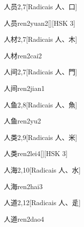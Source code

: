 \begin{entry}{人员}{2,7}[Radicais ⼈、⼝]
  \begin{phonetics}{人员}{ren2yuan2}[][HSK 3]
  \end{phonetics}
\end{entry}

\begin{entry}{人材}{2,7}[Radicais ⼈、⽊]
  \begin{phonetics}{人材}{ren2cai2}
  \end{phonetics}
\end{entry}

\begin{entry}{人间}{2,7}[Radicais ⼈、⾨]
  \begin{phonetics}{人间}{ren2jian1}
  \end{phonetics}
\end{entry}

\begin{entry}{人鱼}{2,8}[Radicais ⼈、⿂]
  \begin{phonetics}{人鱼}{ren2yu2}
  \end{phonetics}
\end{entry}

\begin{entry}{人类}{2,9}[Radicais ⼈、⽶]
  \begin{phonetics}{人类}{ren2lei4}[][HSK 3]
  \end{phonetics}
\end{entry}

\begin{entry}{人海}{2,10}[Radicais ⼈、⽔]
  \begin{phonetics}{人海}{ren2hai3}
  \end{phonetics}
\end{entry}

\begin{entry}{人道}{2,12}[Radicais ⼈、⾡]
  \begin{phonetics}{人道}{ren2dao4}
  \end{phonetics}
\end{entry}

